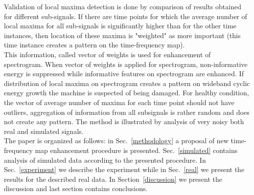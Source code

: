 \documentclass[3p,times]{elsarticle}
\begin{document}
Validation of local maxima detection is done by comparison of results obtained for different sub-signals. If there are time points for which the average number of local maxima for all sub-signals is significantly higher than for the other time instances, then location of these maxima is "weighted" as more important (this time instance creates a pattern on the time-frequency map).\\
This information, called vector of weights is used for enhancement of spectrogram. When vector of weights is applied for spectrogram, non-informative energy is suppressed while informative features on spectrogram are enhanced. If distribution of local maxima on spectrogram creates a pattern on wideband cyclic energy growth the machine is suspected of being damaged. For healthy condition, the vector of average number of maxima for each time point should not have outliers, aggregation of information from all subsignals is rather random and does not create any pattern. The method is illustrated by analysis of very noisy both real and simulated signals.\\
The paper is organized as follows: in Sec.~\ref{methodology} a proposal of new time-frequency map enhancement procedure is presented. Sec.~\ref{simulated} contains analysis of simulated data according to the presented procedure. In Sec.~\ref{experiment} we describe the experiment while in Sec.~\ref{real} we present the results for the described real data. In Section~\ref{discussion} we present the discussion and last section contains conclusions.
\end{document}
